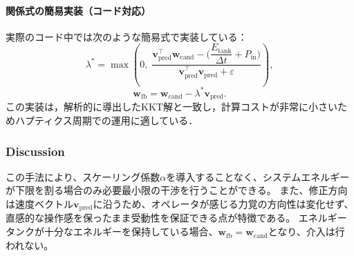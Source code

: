 \documentclass[uplatex]{jsarticle}
\begin{document}
\paragraph{関係式の簡易実装（コード対応）}
実際のコード中では次のような簡易式で実装している：
\[
\lambda^\ast=\max\!\left(0,\; \frac{\boldsymbol{v}_{\mathrm{pred}}^\top\boldsymbol{w}_{\mathrm{cand}} - \big(\dfrac{E_{\mathrm{tank}}}{\Delta t} + P_{\mathrm{in}}\big)}{\boldsymbol{v}_{\mathrm{pred}}^\top\boldsymbol{v}_{\mathrm{pred}} + \varepsilon}\right),
\]
\[
\boldsymbol{w}_{\mathrm{fb}} = \boldsymbol{w}_{\mathrm{cand}} - \lambda^\ast \boldsymbol{v}_{\mathrm{pred}}.
\]
この実装は，解析的に導出したKKT解と一致し，計算コストが非常に小さいためハプティクス周期での運用に適している．

\subsubsection{Discussion}
この手法により、スケーリング係数$\alpha$を導入することなく、システムエネルギーが下限を割る場合のみ必要最小限の干渉を行うことができる。  
また、修正方向は速度ベクトル$\boldsymbol{v}_{\mathrm{pred}}$に沿うため、オペレータが感じる力覚の方向性は変化せず、直感的な操作感を保ったまま受動性を保証できる点が特徴である。  
エネルギータンクが十分なエネルギーを保持している場合、$\boldsymbol{w}_{\mathrm{fb}} = \boldsymbol{w}_{\mathrm{cand}}$となり、介入は行われない。


\end{document}
